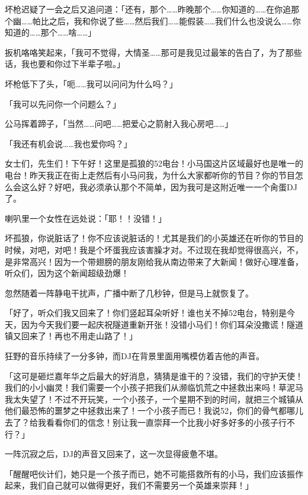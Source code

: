 坏枪迟疑了一会之后又追问道：「还有，那个……昨晚那个……你知道的……在你追那个幽……帕比之后，我和你说了些……然后我们……能假装……我们什么也没说么……你知道的……那个……啥……」

扳机咯咯笑起来，「我可不觉得，大情圣……那可是我见过最笨的告白了，为了那些话，我也要和你过下半辈子啦。」

坏枪低下了头，「呃……我可以问问为什么吗？」

「我可以先问你一个问题么？」

公马挥着蹄子，「当然……问吧……把爱心之箭射入我心房吧……」

「我还有机会说……我也爱你吗？」

\horizonline


{\rt 女士们，先生们！下午好！这里是孤狼的52电台！小马国这片区域最好也是唯一的电台！昨天我正在街上走然后有小马问我，为什么大家都听你的节目？你的节目怎么会这么好？好吧，我必须承认那个不简单，因为我可是这附近唯一一个肏蛋DJ了。}

喇叭里一个女性在远处说：「{\rt 耶！！没错！}」

{\rt 坏孤狼，你说脏话了！你不应该说脏话的！尤其是我们的小英雄还在听你的节目的时候，对吧，对吧！我是个坏蛋我应该害臊才对。不过现在我却觉得很高兴，不，是非常高兴！因为一个带翅膀的朋友刚给我从南边带来了大新闻！做好心理准备，听众们，因为这个新闻超级劲爆！}

忽然随着一阵静电干扰声，广播中断了几秒钟，但是马上就恢复了。

「{\rt 好了，听众们我又回来了！你们竖起耳朵听好！谁也关不掉52电台，特别是今天，因为今天我们要一起庆祝隧道重新开张！没错小马们！你们耳朵没撒谎！隧道镇又回来了！再也不用走山路了！}」

狂野的音乐持续了一分多钟，而DJ在背景里面用嘴模仿着吉他的声音。

「{\rt 这可是砸烂嘉年华之后最大的好消息，猜猜是谁干的？没错，我们的守护天使！我们的小小幽灵！我们需要一个小孩子把我们从濒临饥荒之中拯救出来吗！草泥马我太失望了！不过不开玩笑，一个小孩子，一个星期不到的时间，就把三个城镇从他们最恐怖的噩梦之中拯救出来了！一个小孩子而已！我说52，你们的骨气都哪儿去了？给我看看你们的信念！别让我一直崇拜一个比我小好多好多的小孩子行不行？}」

一阵沉寂之后，DJ的声音又回来了，这一次显得疲惫不堪。

「{\rt 醒醒吧伙计们，她只是一个孩子而已，她不可能搭救所有的小马，我们应该振作起来，我们自己就可以做得更好，我们不需要另一个英雄来崇拜！}」

